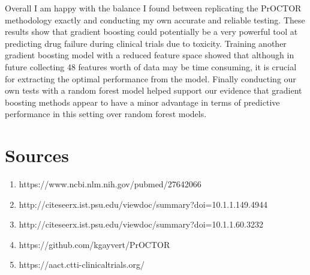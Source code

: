 \documentclass[12pt]{article}
\begin{document}
Overall I am happy with the balance I found between replicating the PrOCTOR methodology exactly and conducting my own accurate and reliable testing. These results show that gradient boosting could potentially be a very powerful tool at predicting drug failure during clinical trials due to toxicity. Training another gradient boosting model with a reduced feature space showed that although in future collecting 48 features worth of data may be time consuming, it is crucial for extracting the optimal performance from the model. Finally conducting our own tests with a random forest model helped support our evidence that gradient boosting methods appear to have a minor advantage in terms of predictive performance in this setting over random forest models.

\newpage

\section{Sources}
\begin{enumerate}
  \item https://www.ncbi.nlm.nih.gov/pubmed/27642066
  \item http://citeseerx.ist.psu.edu/viewdoc/summary?doi=10.1.1.149.4944
  \item http://citeseerx.ist.psu.edu/viewdoc/summary?doi=10.1.1.60.3232
  \item https://github.com/kgayvert/PrOCTOR
  \item https://aact.ctti-clinicaltrials.org/
\end{enumerate}
\end{document}
